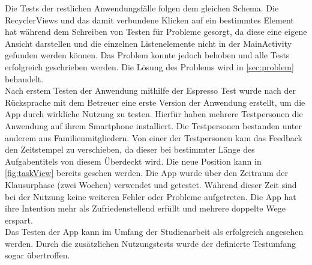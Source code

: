 Die Tests der restlichen Anwendungsfälle folgen dem gleichen Schema. Die RecyclerViews und das damit verbundene Klicken auf ein bestimmtes Element hat während dem Schreiben von Testen für Probleme gesorgt, da diese eine eigene Ansicht darstellen und die einzelnen Listenelemente nicht in der MainActivity gefunden werden können. Das Problem konnte jedoch behoben und alle Tests erfolgreich geschrieben werden. Die Lösung des Problems wird in \autoref{sec:problem} behandelt.\\
Nach erstem Testen der Anwendung mithilfe der Espresso Test wurde nach der Rücksprache mit dem Betreuer eine erste Version der Anwendung erstellt, um die App durch wirkliche Nutzung zu testen. Hierfür haben mehrere Testpersonen die Anwendung auf ihrem Smartphone installiert. Die Testpersonen bestanden unter anderem aus Familienmitgliedern. Von einer der Testpersonen kam das Feedback den Zeitstempel zu verschieben, da dieser bei bestimmter Länge des Aufgabentitels von diesem Überdeckt wird. Die neue Position kann in \autoref{fig:taskView} bereits gesehen werden. Die App wurde über den Zeitraum der Klausurphase (zwei Wochen) verwendet und getestet. Während dieser Zeit sind bei der Nutzung keine weiteren Fehler oder Probleme aufgetreten. Die App hat ihre Intention mehr als Zufriedenstellend erfüllt und mehrere doppelte Wege erspart.\\
Das Testen der App kann im Umfang der Studienarbeit als erfolgreich angesehen werden. Durch die zusätzlichen Nutzungstests wurde der definierte Testumfang sogar übertroffen.

